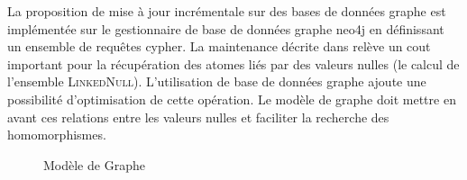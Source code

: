 La proposition de mise à jour incrémentale sur des bases de données graphe est implémentée sur le gestionnaire de base de données graphe \gls{neo4j} en définissant un ensemble de requêtes \gls{cypher}.
La maintenance décrite dans \cite{chabinConsistentUpdatingDatabases2020} relève un cout important pour la récupération des atomes liés par des valeurs nulles (le calcul de l'ensemble \textsc{LinkedNull}).
L'utilisation de base de données graphe ajoute une possibilité d'optimisation de cette opération.
Le modèle de graphe doit mettre en avant ces relations entre les valeurs nulles et faciliter la recherche des homomorphismes.

\begin{figure}[htb]
    \centering
    \begin{adjustbox}{width=.8\linewidth}
    \end{adjustbox}
    \caption{Modèle de Graphe}
    \label{fig:schema-graph}
\end{figure}

